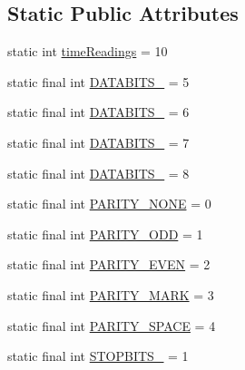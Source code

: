 \subsection*{Static Public Attributes}
\begin{DoxyCompactItemize}
\item 
static int \hyperlink{classcom_1_1eneri_1_1scorpio__metertool_1_1ui_1_1_current_readings_records_a1d3a30be887aa24239c5e6367b56a2b5}{time\+Readings} = 10
\item 
static final int \hyperlink{classcom_1_1eneri_1_1scorpio__metertool_1_1ui_1_1_current_readings_records_aa09e6205ed3df715973d12c9dbaf3591}{D\+A\+T\+A\+B\+I\+T\+S\+\_} = 5
\item 
static final int \hyperlink{classcom_1_1eneri_1_1scorpio__metertool_1_1ui_1_1_current_readings_records_a7fe0aaee4dba9598196176f1e06ba9da}{D\+A\+T\+A\+B\+I\+T\+S\+\_} = 6
\item 
static final int \hyperlink{classcom_1_1eneri_1_1scorpio__metertool_1_1ui_1_1_current_readings_records_ab6417c74e12c8c1b95b7d64579dd45c8}{D\+A\+T\+A\+B\+I\+T\+S\+\_} = 7
\item 
static final int \hyperlink{classcom_1_1eneri_1_1scorpio__metertool_1_1ui_1_1_current_readings_records_a8bf32fd01d3285cf97ceab70e98c2bc1}{D\+A\+T\+A\+B\+I\+T\+S\+\_} = 8
\item 
static final int \hyperlink{classcom_1_1eneri_1_1scorpio__metertool_1_1ui_1_1_current_readings_records_af9879dbcb4d686f245d205a4a6565c7c}{P\+A\+R\+I\+T\+Y\+\_\+\+N\+O\+NE} = 0
\item 
static final int \hyperlink{classcom_1_1eneri_1_1scorpio__metertool_1_1ui_1_1_current_readings_records_ac777f9f8ddbece6f40e6254db12f6bbf}{P\+A\+R\+I\+T\+Y\+\_\+\+O\+DD} = 1
\item 
static final int \hyperlink{classcom_1_1eneri_1_1scorpio__metertool_1_1ui_1_1_current_readings_records_a5072b1758b1912a08e0575deb656ba68}{P\+A\+R\+I\+T\+Y\+\_\+\+E\+V\+EN} = 2
\item 
static final int \hyperlink{classcom_1_1eneri_1_1scorpio__metertool_1_1ui_1_1_current_readings_records_acc3c3dcabb0ebc70777f11e17554982f}{P\+A\+R\+I\+T\+Y\+\_\+\+M\+A\+RK} = 3
\item 
static final int \hyperlink{classcom_1_1eneri_1_1scorpio__metertool_1_1ui_1_1_current_readings_records_a99f696406f4ac66e445f38ed5a34a0c7}{P\+A\+R\+I\+T\+Y\+\_\+\+S\+P\+A\+CE} = 4
\item 
static final int \hyperlink{classcom_1_1eneri_1_1scorpio__metertool_1_1ui_1_1_current_readings_records_a469b6ae5c9cdaf3de7d84e7b84a21972}{S\+T\+O\+P\+B\+I\+T\+S\+\_} = 1

\end{DoxyCompactItemize}
